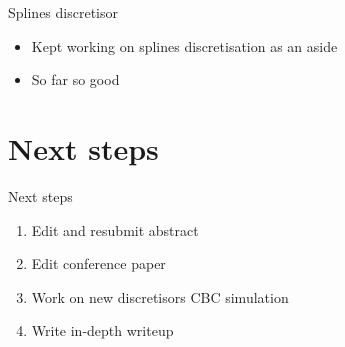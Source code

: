 \documentclass[presentation]{beamer}
\begin{document}
\begin{frame}[label={sec:org8d431d5}]{Splines discretisor}
\begin{itemize}
\item Kept working on splines discretisation as an aside
\item So far so good
\end{itemize}
\end{frame}

\section{Next steps}
\label{sec:org607ab69}
\begin{frame}[label={sec:org55f67a4}]{Next steps}
\begin{enumerate}
\item Edit and resubmit abstract
\item Edit conference paper
\item Work on new discretisors CBC simulation
\item Write in-depth writeup
\end{enumerate}
\end{frame}
\end{document}
